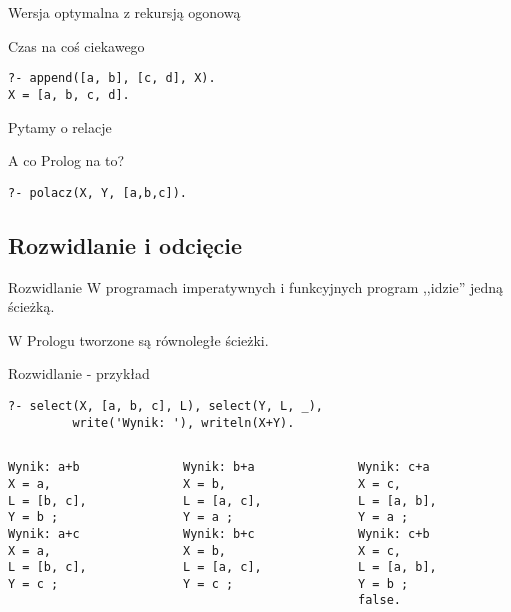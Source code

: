 \documentclass[blue]{beamer}
\begin{document}
\begin{frame}[fragile]{Wersja optymalna z rekursją ogonową}

\end{frame}
\begin{frame}[fragile]{Czas na coś ciekawego}

\begin{lstlisting}
?- append([a, b], [c, d], X).
X = [a, b, c, d].
\end{lstlisting}

Pytamy o relacje

A co Prolog na to?

\begin{lstlisting}
?- polacz(X, Y, [a,b,c]).
\end{lstlisting}
\end{frame}
\subsection{Rozwidlanie i odcięcie}
\begin{frame}[fragile]{Rozwidlanie}
W programach imperatywnych i funkcyjnych program ,,idzie'' jedną ścieżką.

W Prologu tworzone są równoległe ścieżki.

\end{frame}
\begin{frame}[fragile]{Rozwidlanie - przykład}
\begin{lstlisting}
?- select(X, [a, b, c], L), select(Y, L, _),
	     write('Wynik: '), writeln(X+Y).
\end{lstlisting}
\begin{columns}
\begin{column}{.33\linewidth}
\begin{lstlisting}
Wynik: a+b
X = a,
L = [b, c],
Y = b ;
Wynik: a+c
X = a,
L = [b, c],
Y = c ;

\end{lstlisting}
\end{column}
\begin{column}{.33\linewidth}
\begin{lstlisting}
Wynik: b+a
X = b,
L = [a, c],
Y = a ;
Wynik: b+c
X = b,
L = [a, c],
Y = c ;

\end{lstlisting}
\end{column}
\begin{column}{.33\linewidth}
\begin{lstlisting}
Wynik: c+a
X = c,
L = [a, b],
Y = a ;
Wynik: c+b
X = c,
L = [a, b],
Y = b ;
false.
\end{lstlisting}
\end{column}
\end{columns}
\end{frame}
\end{document}
